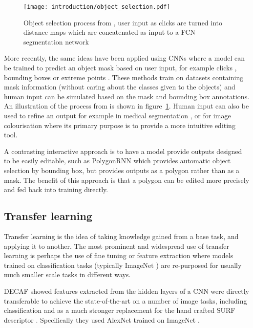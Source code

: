 \begin{figure}[h]
  \centering
  \texttt{[image: introduction/object\_selection.pdf]}
  \caption{Object selection process from \cite{Xu2016b}, user input as clicks are turned into distance maps which are concatenated as input to a \gls{FCN} segmentation network}  
  \label{fig:object_selection}
\end{figure}

More recently, the same ideas have been applied using \gls{CNN}s where a model can be trained to predict an object mask based on user input, for example clicks \cite{Xu2016b, Boroujerdi2017}, bounding boxes \cite {Xu2017} or extreme points \cite{Maninis2017}. These methods train on datasets containing mask information (without caring about the classes given to the objects) and human input can be simulated based on the mask and bounding box annotations. An illustration of the process from \cite{Xu2016b} is shown in figure~\ref{fig:object_selection}. Human input can also be used to refine an output for example in medical segmentation \cite{Wang2017}, or for image colourisation \cite{Zhang} where its primary purpose is to provide a more intuitive editing tool.

A contrasting interactive approach is to have a model provide outputs designed to be easily editable, such as PolygonRNN \cite{Castrejon2017} which provides automatic object selection by bounding box, but provides outputs as a polygon rather than as a mask. The benefit of this approach is that a polygon can be edited more precisely and fed back into training directly.


\subsection {Transfer learning}

Transfer learning is the idea of taking knowledge gained from a base task, and applying it to another. The most prominent and widespread use of transfer learning is perhaps the use of fine tuning or feature extraction where models trained on classification tasks (typically ImageNet \cite{JiaDeng2009}) are re-purposed for usually much smaller scale tasks in different ways. 

\gls{DECAF} \cite{Donahue2014} showed features extracted from the hidden layers of a \gls{CNN} were directly transferable to achieve the state-of-the-art on a number of image tasks, including classification and as a much stronger replacement for the hand crafted \gls{SURF} descriptor \cite{bay2006surf}.  Specifically they used AlexNet  \cite{Krizhevsky2012} trained on ImageNet \cite{JiaDeng2009}.

